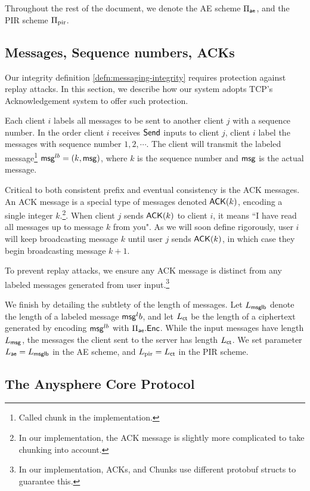 Throughout the rest of the document, we denote the AE scheme $\Pi_{\mathsf{ae}}$, and the PIR scheme $\Pi_{\text{pir}}$.
\subsection{Messages, Sequence numbers, ACKs}
\label{subsec:ACK}
Our integrity definition \cref{defn:messaging-integrity} requires protection against replay attacks. In this section, we describe how our system adopts TCP's Acknowledgement system to offer such protection.

Each client $i$ labels all messages to be sent to another client $j$ with a sequence number. In the order client $i$ receives $\mathsf{Send}$ inputs to client $j$, client $i$ label the messages with sequence number $1,2,\cdots$. The client will transmit the labeled message\footnote{Called chunk in the implementation.} $\mathsf{msg}^{lb} = (k, \mathsf{msg})$, where $k$ is the sequence number and $\mathsf{msg}$ is the actual message. 

Critical to both consistent prefix and eventual consistency is the ACK messages. An ACK message is a special type of messages denoted $\mathsf{ACK}(k)$, encoding a single integer $k$.\footnote{In our implementation, the ACK message is slightly more complicated to take chunking into account.}. When client $j$ sends $\mathsf{ACK}(k)$ to client $i$, it means ``I have read all messages up to message $k$ from you". As we will soon define rigorously, user $i$ will keep broadcasting message $k$ until user $j$ sends $\mathsf{ACK}(k)$, in which case they begin broadcasting message $k + 1$. 

To prevent replay attacks, we ensure any ACK message is distinct from any labeled messages generated from user input.\footnote{In our implementation, ACKs, and Chunks use different protobuf structs to guarantee this.}

We finish by detailing the subtlety of the length of messages. Let $L_{\mathsf{msglb}}$ denote the length of a labeled message $\mathsf{msg}^lb$, and let $L_{\mathsf{ct}}$ be the length of a ciphertext generated by encoding $\mathsf{msg}^{lb}$ with $\Pi_{\mathsf{ae}}.\mathsf{Enc}$. While the input messages have length $L_{\mathsf{msg}}$, the messages the client sent to the server has length $L_{\mathsf{ct}}$. We set parameter $L_{\mathsf{ae}} = L_{\mathsf{msglb}}$ in the AE scheme, and $L_{\text{pir}} = L_{\mathsf{ct}}$ in the PIR scheme.

\subsection{The Anysphere Core Protocol}

